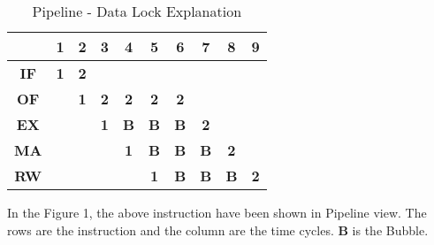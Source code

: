 \documentclass[12pt]{article}
\begin{document}
\begin{itemize}
\begin{table}[]
    \begin{center}
\begin{tabular}{|c|cccccccll}
\hline
\multicolumn{1}{|l|}{} & \multicolumn{1}{c|}{1}          & \multicolumn{1}{c|}{\textbf{2}} & \multicolumn{1}{c|}{\textbf{3}} & \multicolumn{1}{c|}{\textbf{4}} & \multicolumn{1}{c|}{\textbf{5}} & \multicolumn{1}{c|}{\textbf{6}} & \multicolumn{1}{c|}{\textbf{7}} & \multicolumn{1}{c|}{\textbf{8}} & \multicolumn{1}{c|}{\textbf{9}} \\ \hline
\textbf{IF}            & \multicolumn{1}{c|}{\textbf{1}} & \multicolumn{1}{c|}{\textbf{2}} &                                 & \multicolumn{1}{l}{}            & \multicolumn{1}{l}{}            & \multicolumn{1}{l}{}            & \multicolumn{1}{l}{}            &                                 &                                 \\ \cline{1-7}
\textbf{OF}            & \multicolumn{1}{c|}{}           & \multicolumn{1}{c|}{\textbf{1}} & \multicolumn{1}{c|}{\textbf{2}} & \multicolumn{1}{c|}{\textbf{2}} & \multicolumn{1}{c|}{\textbf{2}} & \multicolumn{1}{c|}{\textbf{2}} & \multicolumn{1}{l}{}            &                                 &                                 \\ \cline{1-1} \cline{3-8}
\textbf{EX}            &                                 & \multicolumn{1}{c|}{}           & \multicolumn{1}{c|}{\textbf{1}} & \multicolumn{1}{c|}{\textbf{B}} & \multicolumn{1}{c|}{\textbf{B}} & \multicolumn{1}{c|}{\textbf{B}} & \multicolumn{1}{c|}{\textbf{2}} &                                 &                                 \\ \cline{1-1} \cline{4-9}
\textbf{MA}            &                                 &                                 & \multicolumn{1}{c|}{}           & \multicolumn{1}{c|}{\textbf{1}} & \multicolumn{1}{c|}{\textbf{B}} & \multicolumn{1}{c|}{\textbf{B}} & \multicolumn{1}{c|}{\textbf{B}} & \multicolumn{1}{c|}{\textbf{2}} &                                 \\ \cline{1-1} \cline{5-10} 
\textbf{RW}            &                                 &                                 &                                 & \multicolumn{1}{l|}{}           & \multicolumn{1}{c|}{\textbf{1}} & \multicolumn{1}{c|}{\textbf{B}} & \multicolumn{1}{c|}{\textbf{B}} & \multicolumn{1}{c|}{\textbf{B}} & \multicolumn{1}{c|}{\textbf{2}} \\ \cline{1-1} \cline{6-10} 
\end{tabular}
    \end{center}
    \caption{Pipeline - Data Lock Explanation}
\end{table}
 
    In the Figure 1, the above instruction have been shown in Pipeline view. The rows are the instruction and the column are the time cycles. \textbf{B} is the Bubble.  
\end{itemize}
\end{document}
